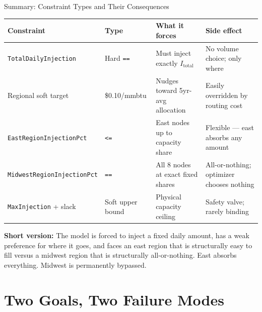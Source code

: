 \documentclass[aspectratio=169, 11pt]{beamer}
\begin{document}
\begin{frame}{Summary: Constraint Types and Their Consequences}
  \begin{table}
    \centering
    \small
    \begin{tabular}{p{3.5cm}p{2.2cm}p{4.0cm}p{3.5cm}}
      \toprule
      \textbf{Constraint} & \textbf{Type} & \textbf{What it forces} & \textbf{Side effect} \\
      \midrule
      \texttt{TotalDailyInjection} & Hard \texttt{==} & Must inject exactly $I_\text{total}$ & No volume choice; only where \\[0.3em]
      Regional soft target & \$0.10/mmbtu & Nudges toward 5yr-avg allocation & Easily overridden by routing cost \\[0.3em]
      \texttt{EastRegionInjectionPct} & \texttt{<=} & East nodes up to capacity share & Flexible --- east absorbs any amount \\[0.3em]
      \texttt{MidwestRegionInjectionPct} & \alert{\texttt{==}} & All 8 nodes at exact fixed shares & \alert{All-or-nothing; optimizer chooses nothing} \\[0.3em]
      \texttt{MaxInjection} + slack & Soft upper bound & Physical capacity ceiling & Safety valve; rarely binding \\
      \bottomrule
    \end{tabular}
  \end{table}

  \vspace{0.3em}
  \textbf{Short version:} The model is forced to inject a fixed daily amount, has a weak preference for where it goes, and faces an east region that is structurally easy to fill versus a midwest region that is structurally all-or-nothing. East absorbs everything. Midwest is permanently bypassed.
\end{frame}


\section{Two Goals, Two Failure Modes}
\end{document}

